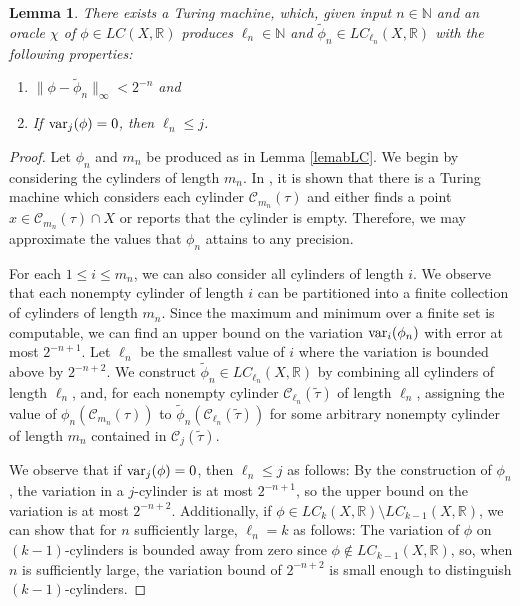 \documentclass[11pt, reqno]{amsart}
\newtheorem{lemma}[theorem]{Lemma}
\newcommand{\bR}{{\mathbb R}}
\newcommand{\bN}{{\mathbb N}}
\newcommand{\cC}{{\mathcal C}}
\def\var{{\rm var}}
\begin{document}
\begin{lemma}
There exists a Turing machine, which, given input $n\in\bN$ and an oracle $\chi$ of $\phi\in LC(X,\bR)$ produces $\ell_n\in\bN$ and $\widetilde{\phi}_n\in LC_{\ell_n}(X,\bR)$ with the following properties:
\begin{enumerate}
\item $\|\phi-\widetilde{\phi}_n\|_{\infty}<2^{-n}$ and
\item If $\var_j(\phi)=0$, then $\ell_n\leq j$.
\end{enumerate}
\end{lemma}
\begin{proof}
Let $\phi_n$ and $m_n$ be produced as in Lemma \ref{lemabLC}.  We begin by considering the cylinders of length $m_n$.  In \cite[Section 5.2]{BSW}, it is shown that there is a Turing machine which considers each cylinder $\cC_{m_n}(\tau)$ and either finds a point $x\in\cC_{m_n}(\tau)\cap X$ or reports that the cylinder is empty.  Therefore, we may approximate the values that $\phi_n$ attains to any precision.

For each $1\leq i\leq m_n$, we can also consider all cylinders of length $i$.  We observe that each nonempty cylinder of length $i$ can be partitioned into a finite collection of cylinders of length $m_n$.  Since the maximum and minimum over a finite set is computable, we can find an upper bound on the variation $\var_i(\phi_n)$ with error at most $2^{-n+1}$.  Let $\ell_n$ be the smallest value of $i$ where the variation is bounded above by $2^{-n+2}$.  We construct $\widetilde{\phi}_n\in LC_{\ell_n}(X,\bR)$ by combining all cylinders of length $\ell_n$, and, for each nonempty cylinder $\cC_{\ell_n}(\widetilde{\tau})$ of length $\ell_n$, assigning the value of $\phi_n(\cC_{m_n}(\tau))$ to $\widetilde{\phi}_n(\cC_{\ell_n}(\widetilde{\tau}))$ for some arbitrary nonempty cylinder of length $m_n$ contained in $\cC_j(\widetilde{\tau})$.

We observe that if $\var_j(\phi)=0$, then $\ell_n\leq j$ as follows:  By the construction of $\phi_n$, the variation in a $j$-cylinder is at most $2^{-n+1}$, so the upper bound on the variation is at most $2^{-n+2}$.  Additionally, if $\phi\in LC_k(X,\bR)\setminus LC_{k-1}(X,\bR)$, we can show that for $n$ sufficiently large, $\ell_n=k$ as follows: The variation of $\phi$ on $(k-1)$-cylinders is bounded away from zero since $\phi\not\in LC_{k-1}(X,\bR)$, so, when $n$ is sufficiently large, the variation bound of $2^{-n+2}$ is small enough to distinguish $(k-1)$-cylinders.
\end{proof}
\end{document}
